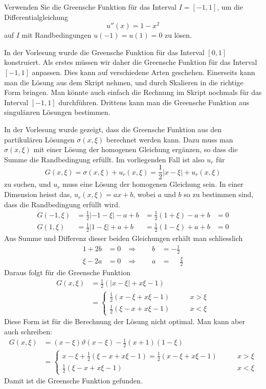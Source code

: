 Verwenden Sie die Greensche Funktion für das Interval $I=[-1,1]$,
um die Differentialgleichung
\begin{equation}
u''(x)=1-x^2
\label{70000006:dgl}
\end{equation}
auf $I$ mit Randbedingungen $u(-1)=u(1)=0$
zu lösen.

\begin{loesung}
In der Vorlesung wurde die Greensche Funktion für das Interval
$[0,1]$ konstruiert. Als erstes müssen wir daher die Greensche
Funktion für das Interval $[-1,1]$ anpassen. Dies kann auf
verschiedene Arten geschehen.
Einerseits kann man die Lösung aus dem
Skript nehmen, und durch Skalieren in die richtige Form bringen.
Man könnte auch einfach die Rechnung im Skript nochmals für
das Interval $[-1,1]$ durchführen. Drittens kann man
die Greensche Funktion aus singulänren Lösungen bestimmen.

In der Vorlesung wurde gezeigt, dass die Greensche Funktion
aus den partikulären Lösungen $\sigma(x,\xi)$ berechnet werden
kann.
Dazu muss man $\sigma(x,\xi)$ mit einer Lösung der homogenen Gleichung
ergänzen, so dass die Summe die Randbedingung erfüllt.
Im vorliegenden Fall ist also $u_r$ für
\[
G(x,\xi)=\sigma(x,\xi)+u_r(x,\xi)
=
{\textstyle\frac12}|x-\xi|+u_r(x,\xi)
\]
zu suchen, und $u_r$ muss eine Lösung der homogenen Gleichung sein.
In einer Dimension heisst das,
$u_r(x,\xi)=ax+b$, wobei $a$ und $b$ so zu bestimmen sind, dass die
Randbedingung erfüllt wird.
\begin{align*}
G(-1,\xi)&={\textstyle\frac12}|-1-\xi|-a+b&={\textstyle\frac12}(1+\xi)-a+b&=0\\
G(1,\xi)&={\textstyle\frac12}|1-\xi|+a+b&={\textstyle\frac12}(1-\xi)+a+b&=0
\end{align*}
Aus Summe und Differenz dieser beiden Gleichungen erhält man
schliesslich
\begin{align*}
1+2b&=0&\Rightarrow\qquad b&=-\frac12\\
\xi-2a&=0&\Rightarrow\qquad a&=\phantom{-}\frac{\xi}2
\end{align*}
Daraus folgt für die Greensche Funktion
\begin{align*}
G(x,\xi)
&=
{\textstyle\frac12}(|x-\xi|+x\xi-1)
\\
&=
\begin{cases}
{\textstyle\frac12}(x-\xi+x\xi - 1)
&\qquad x>\xi\\
{\textstyle\frac12}(\xi-x+x\xi - 1)
&\qquad x<\xi
\end{cases}
\end{align*}
Diese Form ist für die Berechnung der Lösung nicht optimal. Man kann
aber auch schreiben:
\begin{align*}
G(x,\xi)
&=
(x-\xi)\vartheta(x-\xi)-{\textstyle\frac12}(x+1)(1-\xi)
\\
&=
\begin{cases}
x-\xi
+
{\textstyle\frac12}(\xi-x+x\xi-1)
=
{\textstyle\frac12}(x-\xi+x\xi-1)
&\qquad x>\xi\\
{\textstyle\frac12}(\xi-x+x\xi-1)
&\qquad x<\xi
\end{cases}
\end{align*}
Damit ist die Greensche Funktion gefunden.


\end{loesung}
